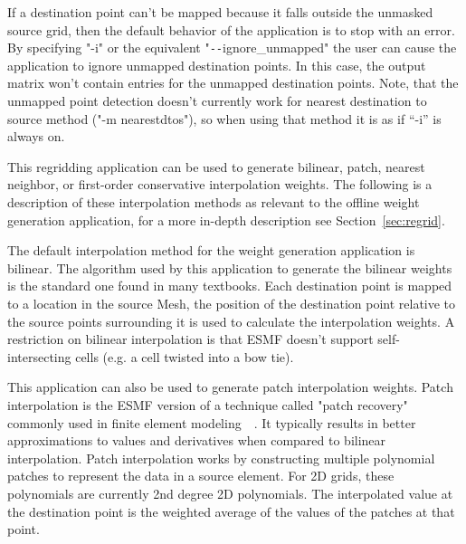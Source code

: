 If a destination point can't be mapped because it falls outside the unmasked source grid, then the default behavior of the application is to stop with an error. By specifying "-i" or the equivalent "\verb+--+ignore\_unmapped" the user can cause the application to ignore unmapped destination points. In this case, the output matrix won't contain entries for the unmapped destination points. Note, that the unmapped point detection doesn't
currently work for nearest destination to source method ("-m nearestdtos"), so when using that method it is as if ``-i'' is always on.

 This regridding application can be used to generate bilinear, patch, nearest neighbor, or first-order conservative interpolation weights. The following is a description of these interpolation methods as relevant to the offline weight generation application, for a more in-depth description see Section~\ref{sec:regrid}.

 The default interpolation method for the weight generation application is bilinear. The algorithm used by this application to 
generate the bilinear weights is the standard one found in many textbooks.  Each destination point is mapped to a location
in the source Mesh, the position of the destination point relative to the source points surrounding it is used to calculate the interpolation weights. A restriction on
bilinear interpolation is that ESMF doesn't support self-intersecting cells (e.g. a cell twisted into a bow tie). 

This application can also be used to generate patch interpolation weights. Patch
interpolation is the ESMF version of a technique called "patch recovery" commonly
used in finite element modeling~\cite{PatchInterp1}~\cite{PatchInterp2}. It typically results in better approximations to values and derivatives when compared to bilinear interpolation.
Patch interpolation works by constructing multiple polynomial patches to represent
the data in a source element. For 2D grids, these polynomials
are currently 2nd degree 2D polynomials. The interpolated value at the destination point
is the weighted average of the values of the patches at that point.

